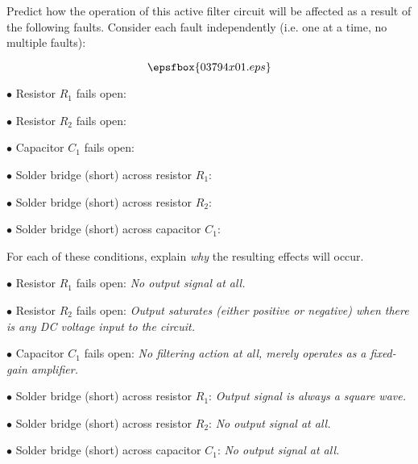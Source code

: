 

Predict how the operation of this active filter circuit will be affected as a result of the following faults.  Consider each fault independently (i.e. one at a time, no multiple faults):

$$\epsfbox{03794x01.eps}$$

\medskip
\item{$\bullet$} Resistor $R_1$ fails open:
\vskip 5pt
\item{$\bullet$} Resistor $R_2$ fails open:
\vskip 5pt
\item{$\bullet$} Capacitor $C_1$ fails open:
\vskip 5pt
\item{$\bullet$} Solder bridge (short) across resistor $R_1$:
\vskip 5pt
\item{$\bullet$} Solder bridge (short) across resistor $R_2$:
\vskip 5pt
\item{$\bullet$} Solder bridge (short) across capacitor $C_1$:
\medskip

For each of these conditions, explain {\it why} the resulting effects will occur.







\medskip
\item{$\bullet$} Resistor $R_1$ fails open: {\it No output signal at all.}
\vskip 5pt
\item{$\bullet$} Resistor $R_2$ fails open: {\it Output saturates (either positive or negative) when there is any DC voltage input to the circuit.}
\vskip 5pt
\item{$\bullet$} Capacitor $C_1$ fails open: {\it No filtering action at all, merely operates as a fixed-gain amplifier.}
\vskip 5pt
\item{$\bullet$} Solder bridge (short) across resistor $R_1$: {\it Output signal is always a square wave.} 
\vskip 5pt
\item{$\bullet$} Solder bridge (short) across resistor $R_2$: {\it No output signal at all.}
\vskip 5pt
\item{$\bullet$} Solder bridge (short) across capacitor $C_1$: {\it No output signal at all.}
\medskip







